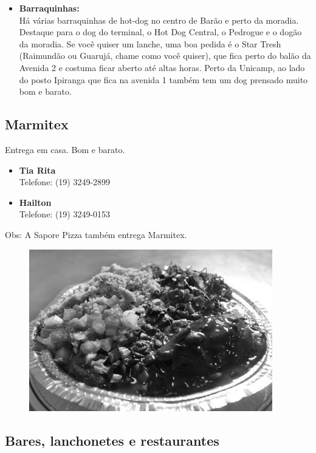 \begin{itemize}
    \item   \textbf{Barraquinhas:}
        \\Há várias barraquinhas de hot-dog no centro de Barão e perto da
        moradia. Destaque para o dog do terminal, o Hot Dog Central, o Pedrogue
        e o dogão da moradia. Se você quiser um lanche, uma boa pedida é o Star
        Tresh (Raimundão ou Guarujá, chame como você quiser), que fica perto do
        balão da Avenida 2 e costuma ficar aberto até altas horas. Perto da
        Unicamp, ao lado do posto Ipiranga que fica na avenida 1 também tem um
        dog prensado muito bom e barato.
\end{itemize}

\subsection{Marmitex}

Entrega em casa. Bom e barato.

\begin{itemize}
    \item   \textbf{Tia Rita}
        \\Telefone: (19) 3249-2899

    \item   \textbf{Hailton}
        \\Telefone: (19) 3249-0153
\end{itemize}

Obs: A Sapore Pizza também entrega Marmitex.

\begin{figure}[h!]
    \centering
    \includegraphics[width=.45\textwidth]{img/barao/marmitex.jpg}
\end{figure}

\subsection{Bares, lanchonetes e restaurantes}

